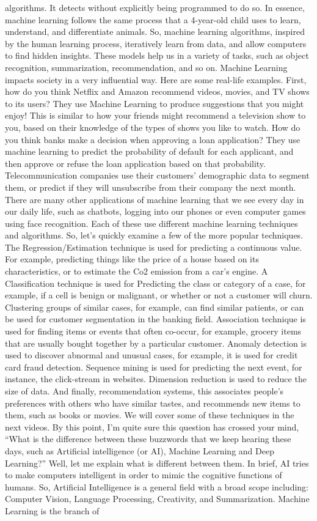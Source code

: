 algorithms. It detects without explicitly being programmed to do so. In essence, machine learning follows the same process that a 4-year-old child uses to learn, understand, and differentiate animals. So, machine learning algorithms, inspired by the human learning process, iteratively learn from data, and allow computers to find hidden insights. These models help us in a variety of tasks, such as object recognition, summarization, recommendation, and so on. Machine Learning impacts society in a very influential way. Here are some real-life examples. First, how do you think Netflix and Amazon recommend videos, movies, and TV shows to its users? They use Machine Learning to produce suggestions that you might enjoy! This is similar to how your friends might recommend a television show to you, based on their knowledge of the types of shows you like to watch. How do you think banks make a decision when approving a loan application? They use machine learning to predict the probability of default for each applicant, and then approve or refuse the loan application based on that probability. Telecommunication companies use their customers’ demographic data to segment them, or predict if they will unsubscribe from their company the next month. There are many other applications of machine learning that we see every day in our daily life, such as chatbots, logging into our phones or even computer games using face recognition. Each of these use different machine learning techniques and algorithms. So, let’s quickly examine a few of the more popular techniques. The Regression/Estimation technique is used for predicting a continuous value. For example, predicting things like the price of a house based on its characteristics, or to estimate the Co2 emission from a car’s engine. A Classification technique is used for Predicting the class or category of a case, for example, if a cell is benign or malignant, or whether or not a customer will churn. Clustering groups of similar cases, for example, can find similar patients, or can be used for customer segmentation in the banking field. Association technique is used for finding items or events that often co-occur, for example, grocery items that are usually bought together by a particular customer. Anomaly detection is used to discover abnormal and unusual cases, for example, it is used for credit card fraud detection. Sequence mining is used for predicting the next event, for instance, the click-stream in websites. Dimension reduction is used to reduce the size of data. And finally, recommendation systems, this associates people's preferences with others who have similar tastes, and recommends new items to them, such as books or movies. We will cover some of these techniques in the next videos. By this point, I’m quite sure this question has crossed your mind, “What is the difference between these buzzwords that we keep hearing these days, such as Artificial intelligence (or AI), Machine Learning and Deep Learning?” Well, let me explain what is different between them. In brief, AI tries to make computers intelligent in order to mimic the cognitive functions of humans. So, Artificial Intelligence is a general field with a broad scope including: Computer Vision, Language Processing, Creativity, and Summarization. Machine Learning is the branch of 